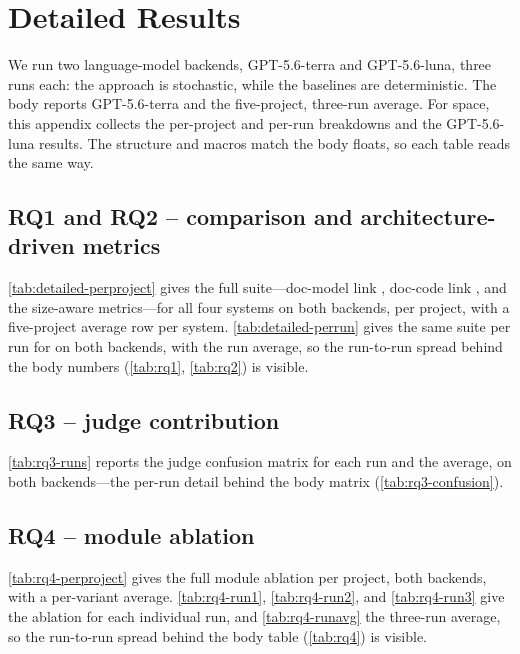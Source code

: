 \section{Detailed Results}
\label{app:detailed}

We run two language-model backends, GPT-5.6-terra and GPT-5.6-luna, three runs each: the approach is
stochastic, while the baselines are deterministic. The body reports GPT-5.6-terra and the five-project,
three-run average. For space, this appendix collects the per-project and per-run breakdowns and the
GPT-5.6-luna results. The structure and macros match the body floats, so each table reads the same way.

\subsection{RQ1 and RQ2 -- comparison and architecture-driven metrics}
\autoref{tab:detailed-perproject} gives the full suite---doc-model link \fone, doc-code link \fone,
and the size-aware metrics---for all four systems on both backends, per project, with a five-project
average row per system. \autoref{tab:detailed-perrun} gives the same suite per run for \approach{}
on both backends, with the run average, so the run-to-run spread behind the body numbers
(\autoref{tab:rq1}, \autoref{tab:rq2}) is visible.



\subsection{RQ3 -- judge contribution}
\autoref{tab:rq3-runs} reports the judge confusion matrix for each run and the average, on both
backends---the per-run detail behind the body matrix (\autoref{tab:rq3-confusion}).


\subsection{RQ4 -- module ablation}
\autoref{tab:rq4-perproject} gives the full module ablation per project, both backends, with a
per-variant average. \autoref{tab:rq4-run1}, \autoref{tab:rq4-run2}, and \autoref{tab:rq4-run3}
give the ablation for each individual run, and \autoref{tab:rq4-runavg} the three-run average, so
the run-to-run spread behind the body table (\autoref{tab:rq4}) is visible.





